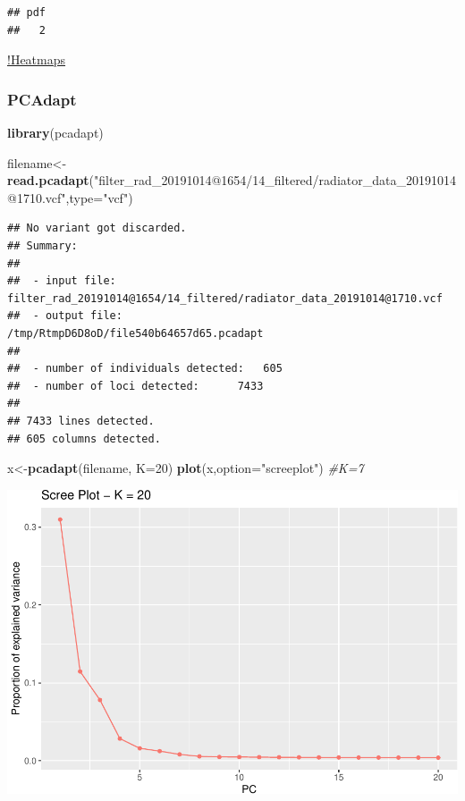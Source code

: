 \documentclass[]{article}
\newenvironment{Shaded}{\begin{snugshade}}{\end{snugshade}}
\newcommand{\KeywordTok}[1]{\textcolor[rgb]{0.13,0.29,0.53}{\textbf{#1}}}
\newcommand{\DataTypeTok}[1]{\textcolor[rgb]{0.13,0.29,0.53}{#1}}
\newcommand{\DecValTok}[1]{\textcolor[rgb]{0.00,0.00,0.81}{#1}}
\newcommand{\StringTok}[1]{\textcolor[rgb]{0.31,0.60,0.02}{#1}}
\newcommand{\CommentTok}[1]{\textcolor[rgb]{0.56,0.35,0.01}{\textit{#1}}}
\newcommand{\NormalTok}[1]{#1}
\begin{document}
\begin{verbatim}
## pdf 
##   2
\end{verbatim}

\href{\%22../figs/fst_heatmaps.png\%22}{!Heatmaps}

\subsubsection{PCAdapt}\label{pcadapt}

\begin{Shaded}
\begin{Highlighting}[]
\KeywordTok{library}\NormalTok{(pcadapt)}
\end{Highlighting}
\end{Shaded}

\begin{Shaded}
\begin{Highlighting}[]
\NormalTok{filename<-}\KeywordTok{read.pcadapt}\NormalTok{(}\StringTok{"filter_rad_20191014@1654/14_filtered/radiator_data_20191014@1710.vcf"}\NormalTok{,}\DataTypeTok{type=}\StringTok{"vcf"}\NormalTok{)}
\end{Highlighting}
\end{Shaded}

\begin{verbatim}
## No variant got discarded.
## Summary:
## 
##  - input file:               filter_rad_20191014@1654/14_filtered/radiator_data_20191014@1710.vcf
##  - output file:              /tmp/RtmpD6D8oD/file540b64657d65.pcadapt
## 
##  - number of individuals detected:   605
##  - number of loci detected:      7433
## 
## 7433 lines detected.
## 605 columns detected.
\end{verbatim}

\begin{Shaded}
\begin{Highlighting}[]
\NormalTok{x<-}\KeywordTok{pcadapt}\NormalTok{(filename, }\DataTypeTok{K=}\DecValTok{20}\NormalTok{)}
\KeywordTok{plot}\NormalTok{(x,}\DataTypeTok{option=}\StringTok{"screeplot"}\NormalTok{) }\CommentTok{#K=7}
\end{Highlighting}
\end{Shaded}

\includegraphics{202_fwsw_reanalysis_files/figure-latex/pcadapt_choose-1}
\end{document}
